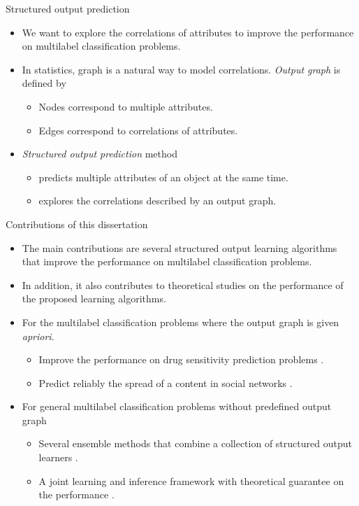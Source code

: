 \documentclass[first=purple,second=dgreen,logo=redexc]{aaltoslides}
\begin{document}
{\begin{frame}{Structured output prediction}
	\begin{itemize}
		\item We want to explore the correlations of attributes to improve the performance on multilabel classification problems.
		\item In statistics, graph is a natural way to model correlations. \textit{Output graph} is defined by
		\begin{itemize}
			\footnotesize
			\item Nodes correspond to multiple attributes.
			\item Edges correspond to correlations of attributes.
		\end{itemize}
		\item \textit{Structured output prediction} method
		\begin{itemize}
			\footnotesize
			\item predicts multiple attributes of an object at the same time.
			\item explores the correlations described by an output graph.
		\end{itemize}
	\end{itemize}
\end{frame}

\begin{frame}{Contributions of this dissertation}
	\begin{itemize}
		\item The main contributions are several structured output learning algorithms that improve the performance on multilabel classification problems.
		\item In addition, it also contributes to theoretical studies on the performance of the proposed learning algorithms.
		\item For the multilabel classification problems where the output graph is given \textit{apriori}.
		\begin{itemize}
			\footnotesize
			\item Improve the performance on drug sensitivity prediction problems \citep{su10structured}.
			\item Predict reliably the spread of a content in social networks \citep{su14structured}.
		\end{itemize}
		\item For general multilabel classification problems without predefined output graph
		\begin{itemize}
			\footnotesize
			\item Several ensemble methods that combine a collection of structured output learners \citep{su11mutitask,su2013multilabelacml,su14multilabel}.
			\item A joint learning and inference framework with theoretical guarantee on the performance \citep{su14multilabelnips}.
		\end{itemize}
	\end{itemize}
\end{frame}



}
\end{document}
